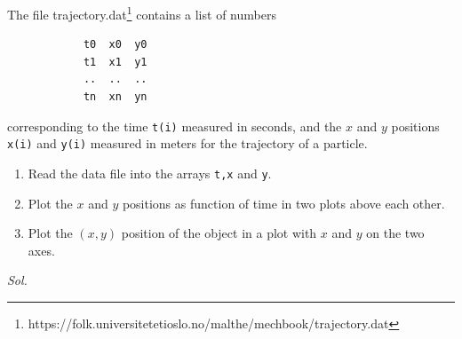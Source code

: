     \begin{problem}\label{problem_2.11}
        The file trajectory.dat\footnote[1]{https://folk.universitetetioslo.no/malthe/mechbook/trajectory.dat} contains a list of numbers 
        \begin{verbatim}
            t0  x0  y0
            t1  x1  y1
            ..  ..  ..
            tn  xn  yn
        \end{verbatim}
        corresponding to the time \verb|t(i)| measured in seconds, and the $x$ and $y$ positions \verb|x(i)| and \verb|y(i)| measured in meters for the trajectory of a particle.
        \begin{enumerate}
            \item Read the data file into the arrays \verb|t,x| and \verb|y|.
            \item Plot the $x$ and $y$ positions as function of time in two plots above each other.
            \item Plot the $(x,y)$ position of the object in a plot with $x$ and $y$ on the two axes.
        \end{enumerate}
    \end{problem}
    \textit{ Sol. }
    
